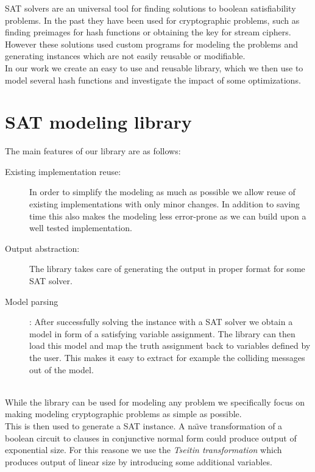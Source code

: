 \documentclass[myposter,portrait]{sciposter}
\def\mysection#1{
{\color{sectionCol}\section*{\sc\bfseries #1}}}
\begin{document}
\begin{multicols*}{3}
SAT solvers are an universal tool for finding solutions to boolean satisfiability problems.
In the past they have been used for cryptographic problems, such as finding preimages for hash functions or obtaining the key for stream ciphers.
However these solutions used custom programs for modeling the problems and generating instances which are not easily reusable or modifiable.
~\\

In our work we create an easy to use and reusable library, which we then use to model several hash functions and investigate the impact of some optimizations.

\mysection{SAT modeling library}
The main features of our library are as follows:

\begin{description}
\item[Existing implementation reuse:] In order to simplify the modeling as much as possible we allow reuse of existing implementations with only minor changes.
In addition to saving time this also makes the modeling less error-prone as we can build upon a well tested implementation.

\item[Output abstraction:] The library takes care of generating the output in proper format for some SAT solver.

\item[Model parsing]: After successfully solving the instance with a SAT solver we obtain a model in form of a satisfying variable assignment.
The library can then load this model and map the truth assignment back to variables defined by the user.
This makes it easy to extract for example the colliding messages out of the model.
\end{description}
~\\

While the library can be used for modeling any problem we specifically focus on making modeling cryptographic problems as simple as possible.
~\\


This is then used to generate a SAT instance.
A na\"{\i}ve transformation of a boolean circuit to clauses in conjunctive normal form could produce output of exponential size.
For this reasone we use the \emph{Tseitin transformation} \cite{tseitin1983complexity} which produces output of linear size by introducing some additional variables.
~\\


\end{multicols*}
\end{document}
